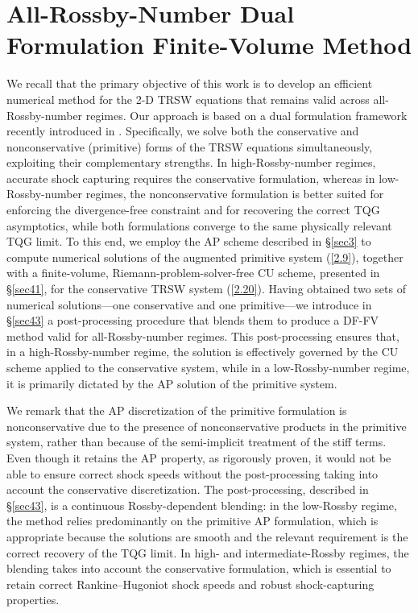\documentclass[a4paper,11pt,twoside]{article}
\numberwithin{equation}{section}
\numberwithin{figure}{section}
\numberwithin{table}{section}
\newcommand\eref[1]{(\ref{#1})}
\newcommand{\RIIIcolor}[1]{{\leavevmode\color{magenta} #1}}
\begin{document}
\section{All-Rossby-Number Dual Formulation Finite-Volume Method}\label{sec4}
We recall that the primary objective of this work is to develop an efficient numerical method for the 2-D TRSW equations that remains valid
across all-Rossby-number regimes. Our approach is based on a dual formulation framework recently introduced in
\cite{Abgrall_2025,CFKM,CKKM}. Specifically, we solve both the conservative and nonconservative (primitive) forms of the TRSW equations
simultaneously, exploiting their complementary strengths. In high-Rossby-number regimes, accurate shock capturing requires the conservative
formulation, whereas in low-Rossby-number regimes, the nonconservative formulation is better suited for enforcing the divergence-free
constraint and for recovering the correct TQG asymptotics, while both formulations converge to the same physically relevant TQG limit. To
this end, we employ the AP scheme described in \S\ref{sec3} to compute numerical solutions of the augmented primitive system \eref{2.9},
together with a finite-volume, Riemann-problem-solver-free CU scheme, presented in \S\ref{sec41}, for the conservative TRSW system
\eref{2.20}. Having obtained two sets of numerical solutions---one conservative and one primitive---we introduce in \S\ref{sec43} a
post-processing procedure that blends them to produce a DF-FV method valid for all-Rossby-number regimes. This post-processing ensures that,
in a high-Rossby-number regime, the solution is effectively governed by the CU scheme applied to the conservative system, while in a
low-Rossby-number regime, it is primarily dictated by the AP solution of the primitive system.

\RIIIcolor{
\begin{remark}
	We remark that the AP discretization of the primitive formulation is nonconservative due to the presence of nonconservative products in the primitive system, rather than because of the semi-implicit treatment of the stiff terms.
	Even though it retains the AP property, as rigorously proven, it would not be able to ensure correct shock speeds without the post-processing taking into account the conservative discretization.
	The post-processing, described in \S\ref{sec43}, is a continuous Rossby-dependent blending: in the low-Rossby regime, the method relies predominantly on the primitive AP formulation, which is appropriate because the solutions are smooth and the relevant requirement is the correct recovery of the TQG limit. In high- and intermediate-Rossby regimes, the blending takes into account the conservative formulation, which is essential to retain correct Rankine--Hugoniot shock speeds and robust shock-capturing properties.
\end{remark}
}
\end{document}
